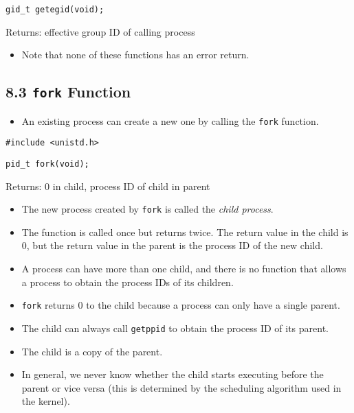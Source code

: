\documentclass[]{article}
\newcommand{\code}{\texttt}
\begin{document}
\code{gid\_t getegid(void);}

Returns: effective group ID of calling process

\begin{itemize}
\item Note that none of these functions has an error return.
\end{itemize}

\subsection*{8.3 \code{fork} Function}
\begin{itemize}
\item An existing process can create a new one by calling the \code{fork}
function.
\end{itemize}

\code{\#include <unistd.h>}

\code{pid\_t fork(void);}

Returns: 0 in child, process ID of child in parent

\begin{itemize}
\item The new process created by \code{fork} is called the \emph{child process}.
\item The function is called once but returns twice. The return value in the
child is 0, but the return value in the parent is the process ID of the new
child.
\item A process can have more than one child, and there is no function that
allows a process to obtain the process IDs of its children.
\item \code{fork} returns 0 to the child because a process can only have a
single parent.
\item The child can always call \code{getppid} to obtain the process ID of its
parent.
\item The child is a copy of the parent.
\item In general, we never know whether the child starts executing before the
parent or vice versa (this is determined by the scheduling algorithm used in the
kernel).
\end{itemize}
\end{document}
